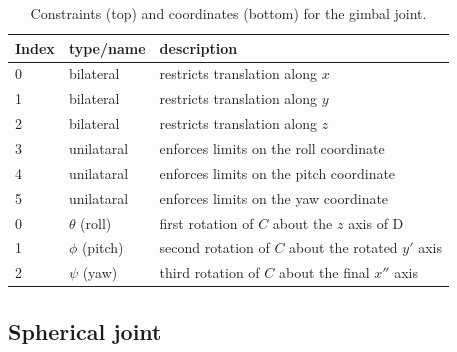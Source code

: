 \begin{table}[h]
\centering
\begin{tabular}{|l|l|l|}
\hline
Index & type/name & description \\
\hline
0 & bilateral & restricts translation along $x$ \\
1 & bilateral & restricts translation along $y$ \\
2 & bilateral & restricts translation along $z$ \\
3 & unilataral & enforces limits on the roll coordinate \\
4 & unilataral & enforces limits on the pitch coordinate \\
5 & unilataral & enforces limits on the yaw coordinate \\
\hline
\hline
0 & $\theta$ (roll) & first rotation of $C$ about the $z$ axis of D \\
1 & $\phi$ (pitch) & second rotation of $C$ about the rotated $y'$ axis \\
2 & $\psi$ (yaw) & third rotation of $C$ about the final $x''$ axis \\
\hline
\end{tabular}
\caption{Constraints (top) and coordinates (bottom) for the gimbal joint.}
\label{GimbalConstraints:tbl}
\end{table}

\subsection{Spherical joint}

